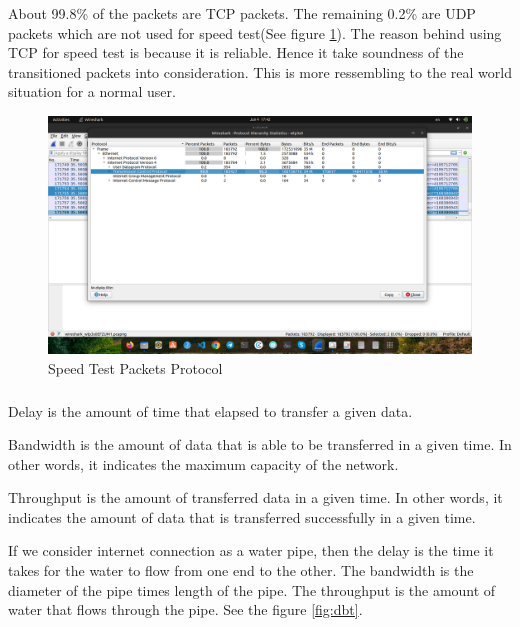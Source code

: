 \documentclass[en]{university}
\begin{document}
\subsubsection{}
About 99.8\% of the packets are TCP packets. The remaining 0.2\% are UDP packets which are not used for speed test(See figure \ref{fig:WSSTP}). The reason behind using TCP for speed test is because it is reliable. Hence it take soundness of the transitioned packets into consideration. This is more ressembling to the real world situation for a normal user.

\begin{figure}
    \centering
    \includegraphics[width=\textwidth]{./resources/WSSTP.png}
    \caption{Speed Test Packets Protocol}
    \label{fig:WSSTP}
\end{figure}

\subsubsection{}
Delay is the amount of time that elapsed to transfer a given data. 

Bandwidth is the amount of data that is able to be transferred in a given time. In other words, it indicates the maximum capacity of the network.

Throughput is the amount of transferred data in a given time. In other words, it indicates the amount of data that is transferred successfully in a given time.

If we consider internet connection as a water pipe, then the delay is the time it takes for the water to flow from one end to the other. The bandwidth is the diameter of the pipe times length of the pipe. The throughput is the amount of water that flows through the pipe. See the figure \ref{fig:dbt}.
\end{document}
